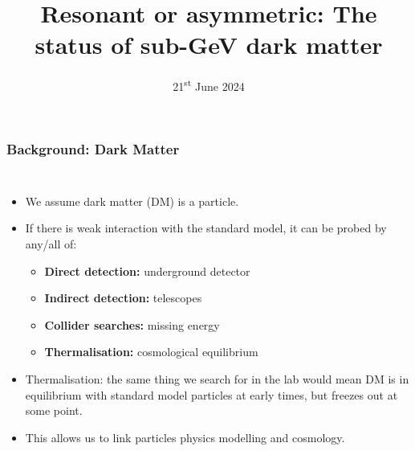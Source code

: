 \documentclass[aspectratio=169]{beamer}
\title{Resonant or asymmetric: The status of sub-GeV dark matter }
\subtitle{\arxiv{2405.17548}}
\date{21\textsuperscript{st} June 2024}
\begin{document}
\begin{frame}
    \titlepage
\end{frame}

\begin{frame}
    \frametitle{Background: Dark Matter}

    \begin{columns}
        \begin{itemize}
            \item We assume dark matter (DM) is a particle.
            \item If there is weak interaction with the standard model, it can be probed by  any/all of:
                \begin{itemize}
                    \item \textbf{Direct detection:} underground detector
                    \item \textbf{Indirect detection:} telescopes
                    \item \textbf{Collider searches:} missing energy
                    \item \textbf{Thermalisation:} cosmological equilibrium
                \end{itemize}
            \item Thermalisation: the same thing we search for in the lab would mean DM is in equilibrium with standard model particles at early times, but freezes out at some point.
            \item This allows us to link particles physics modelling and cosmology.
        \end{itemize}
%
%
%
%
%


\end{columns}
\end{frame}
\end{document}
